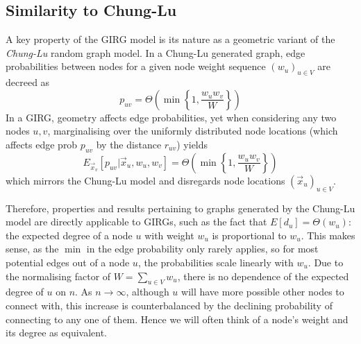 
\subsection{Similarity to Chung-Lu}
A key property of the GIRG model is its nature as a geometric variant of the \textit{Chung-Lu} random graph model. In a Chung-Lu generated graph, edge probabilities between nodes for a given node weight sequence $(w_u)_{u \in V}$ are decreed as
\begin{equation}
    p_{uv} = \Theta \left (\min \left \{1, \frac{w_u w_v}{W} \right \} \right )
\end{equation}
In a GIRG, geometry affects edge probabilities, yet when considering any two nodes $u,v$, marginalising over the uniformly distributed node locations (which affects edge prob $p_{uv}$ by the distance $r_{uv}$) yields
\begin{equation}
    E_{\vec{x}_v}[p_{uv} | \vec{x}_u, w_u, w_v] = \Theta \left (\min \left \{1, \frac{w_u w_v}{W} \right \} \right )
    \label{eq:GIRG_edge_prob_marginalised}
\end{equation}
which mirrors the Chung-Lu model and disregards node locations $(\vec{x}_u)_{u \in V}$.

Therefore, properties and results pertaining to graphs generated by the Chung-Lu model are directly applicable to GIRGs, such as the fact that $E[d_u] = \Theta(w_u)$: the expected degree of a node $u$ with weight $w_u$ is proportional to $w_u$. This makes sense, as the $\min$ in the edge probability only rarely applies, so for most potential edges out of a node $u$, the probabilities scale linearly with $w_u$. Due to the normalising factor of $W = \sum_{u \in V} w_u$, there is no dependence of the expected degree of $u$ on $n$. As $n \to \infty$, although $u$ will have more possible other nodes to connect with, this increase is counterbalanced by the declining probability of connecting to any one of them. Hence we will often think of a node's weight and its degree as equivalent.


